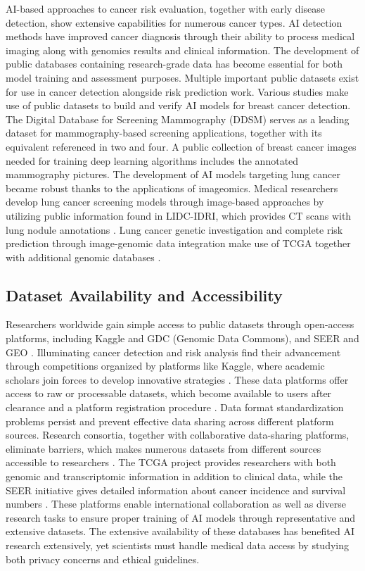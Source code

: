 \documentclass[conference]{IEEEtran}
\begin{document}
AI-based approaches to cancer risk evaluation, together with early disease detection, show extensive capabilities for numerous cancer types. AI detection methods have improved cancer diagnosis through their ability to process medical imaging along with genomics results and clinical information. The development of public databases containing research-grade data has become essential for both model training and assessment purposes.
Multiple important public datasets exist for use in cancer detection alongside risk prediction work.
Various studies make use of public datasets to build and verify AI models for breast cancer detection. The Digital Database for Screening Mammography (DDSM) serves as a leading dataset for mammography-based screening applications, together with its equivalent referenced in two and four. A public collection of breast cancer images needed for training deep learning algorithms includes the annotated mammography pictures. 
The development of AI models targeting lung cancer became robust thanks to the applications of imageomics. Medical researchers develop lung cancer screening models through image-based approaches by utilizing public information found in LIDC-IDRI, which provides CT scans with lung nodule annotations \cite{12}. Lung cancer genetic investigation and complete risk prediction through image-genomic data integration make use of TCGA together with additional genomic databases \cite{10}.


\subsection{Dataset Availability and Accessibility}
Researchers worldwide gain simple access to public datasets through open-access platforms, including Kaggle and GDC (Genomic Data Commons), and SEER and GEO \cite{5}. Illuminating cancer detection and risk analysis find their advancement through competitions organized by platforms like Kaggle, where academic scholars join forces to develop innovative strategies \cite{27}. These data platforms offer access to raw or processable datasets, which become available to users after clearance and a platform registration procedure \cite{25}. Data format standardization problems persist and prevent effective data sharing across different platform sources.
Research consortia, together with collaborative data-sharing platforms, eliminate barriers, which makes numerous datasets from different sources accessible to researchers \cite{4}. The TCGA project provides researchers with both genomic and transcriptomic information in addition to clinical data, while the SEER initiative gives detailed information about cancer incidence and survival numbers \cite{18}. These platforms enable international collaboration as well as diverse research tasks to ensure proper training of AI models through representative and extensive datasets.
The extensive availability of these databases has benefited AI research extensively, yet scientists must handle medical data access by studying both privacy concerns and ethical guidelines.
\end{document}
